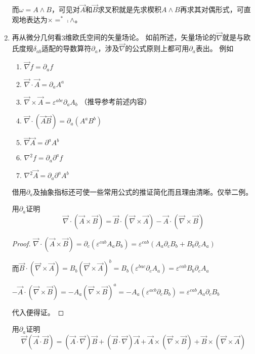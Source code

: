 \begin{enumerate}[（1）]
    而$\omega = A \wedge B$，可见对$\vec A$和$\vec B$求叉积就是先求楔积$A \wedge B$再求其对偶形式，可直观地表达为$\times = ^* \comp \wedge$。
    \item 再从微分几何看$3$维欧氏空间的矢量场论。
    如前所述，矢量场论的$\vec\nabla$就是与欧氏度规$\delta_{ab}$适配的导数算符$\partial_a$，涉及$\vec\nabla$的公式原则上都可用$\partial_a$表出。
    例如
    \begin{enumerate}[（a）]
        \item $\vec\nabla f = \partial_af$
        \item $\vec\nabla \cdot \vec A = \partial_aA^a$
        \item $\vec\nabla \times \vec A = \varepsilon^{abc}\partial_aA_b$ （推导参考前述内容）
        \item $\vec\nabla \cdot (\vec A \vec B) = \partial_a(A^aB^b)$
        \item $\vec\nabla\vec A = \partial^aA^b$
        \item $\nabla^2f = \partial_a\partial^af$
        \item $\nabla^2\vec A = \partial_a\partial^aA^b$
    \end{enumerate}
    借用$\partial_a$及抽象指标还可使一些常用公式的推证简化而且理由清晰。仅举二例。
    
    \begin{example}
    用$\partial_a$证明
    $$\vec\nabla\cdot(\vec A \times \vec B) = \vec B \cdot (\vec\nabla \times \vec A) - \vec A \cdot (\vec\nabla \times \vec B)$$
    \end{example}

    \begin{proof}
        $\vec\nabla\cdot(\vec A \times \vec B) = \partial_c(\varepsilon^{cab}A_aB_b) = \varepsilon^{cab}(A_a\partial_cB_b + B_b\partial_cA_a)$
        
        而$\vec B \cdot (\vec\nabla \times \vec A) = B_b(\vec\nabla \times \vec A)^b = B_b(\varepsilon^{bac}\partial_cA_a) = \varepsilon^{cab}B_b\partial_cA_a$
        
        $-\vec A \cdot (\vec\nabla \times \vec B) = -A_a(\vec\nabla \times \vec B)^a = -A_a(\varepsilon^{acb}\partial_cB_b) = \varepsilon^{cab}A_a\partial_cB_b$
        
        代入便得证。
    \end{proof}

    \begin{example}
        用$\partial_a$证明
        $$\vec\nabla(\vec A \cdot \vec B) = (\vec A \cdot \vec\nabla)\vec B + (\vec B \cdot \vec\nabla)\vec A + \vec A \times (\vec\nabla \times \vec B) + \vec B \times (\vec\nabla \times \vec A)$$
    \end{example}


\end{enumerate}
